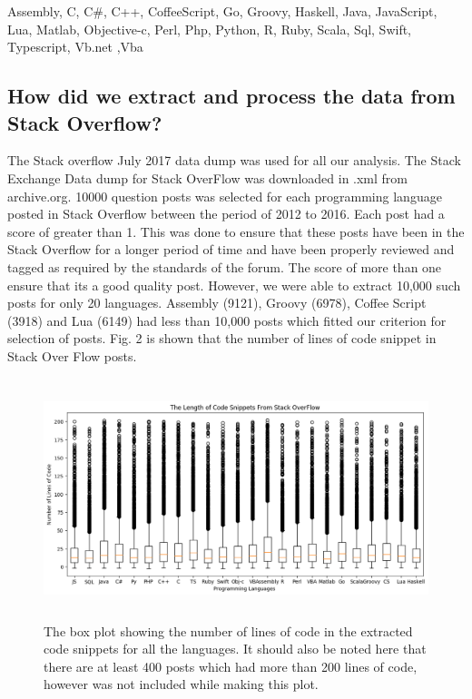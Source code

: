 \documentclass[letterpaper, 10 pt, conference]{ieeeconf}  %
\begin{document}
\begin{framed}
Assembly, C, C\#, C++, CoffeeScript, Go, Groovy, Haskell, Java,  JavaScript, Lua, Matlab, Objective-c, Perl, Php, Python, R, Ruby, Scala, Sql, Swift, Typescript, Vb.net ,Vba
\end{framed}

\subsection{How did we extract and process the data from Stack Overflow?}
The Stack overflow July 2017 data dump was used for all our analysis. The Stack Exchange Data dump for Stack OverFlow was downloaded in .xml from archive.org. 10000 question posts was selected for each programming language posted in Stack Overflow between the period of 2012 to 2016. Each post had a score of greater than 1. This was done to ensure that these posts have been in the Stack Overflow for a longer period of time and have been properly reviewed and tagged as required by the standards of the forum. The score of more than one ensure that its a good quality post. However, we were able to extract 10,000 such posts for only 20 languages. Assembly (9121), Groovy (6978), Coffee Script (3918) and Lua (6149) had less than 10,000 posts which fitted our criterion for selection of posts. Fig. 2 is shown that the number of lines of code snippet in Stack Over Flow posts.


\begin{figure}
  \includegraphics[width=\textwidth,height=7cm]{PlotBox.png}
  \caption{The box plot showing the number of lines of code in the extracted code snippets for all the languages. It should also be noted here that there are at least 400 posts which had more than 200 lines of code, however was not included while making this plot.}
  \label{fig:BOXPLOT}
\end{figure}
\end{document}
